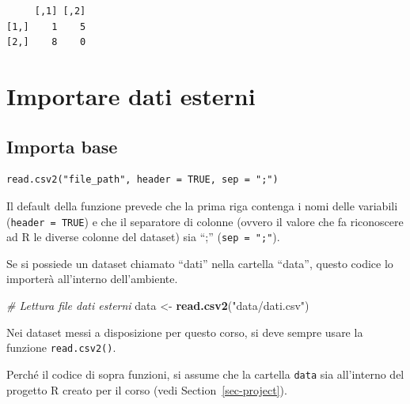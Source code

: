 \documentclass[
  a4paper,
  DIV=11,
  numbers=noendperiod]{scrreprt}
\newenvironment{Shaded}{\begin{snugshade}}{\end{snugshade}}
\newcommand{\CommentTok}[1]{\textcolor[rgb]{0.56,0.35,0.01}{\textit{#1}}}
\newcommand{\FunctionTok}[1]{\textcolor[rgb]{0.13,0.29,0.53}{\textbf{#1}}}
\newcommand{\NormalTok}[1]{#1}
\newcommand{\OtherTok}[1]{\textcolor[rgb]{0.56,0.35,0.01}{#1}}
\newcommand{\StringTok}[1]{\textcolor[rgb]{0.31,0.60,0.02}{#1}}
\begin{document}
\begin{verbatim}
     [,1] [,2]
[1,]    1    5
[2,]    8    0
\end{verbatim}

\section{Importare dati esterni}\label{importare-dati-esterni}

\subsection{Importa base}\label{importa-base}

\begin{verbatim}
read.csv2("file_path", header = TRUE, sep = ";")
\end{verbatim}

Il default della funzione prevede che la prima riga contenga i nomi
delle variabili (\texttt{header\ =\ TRUE}) e che il separatore di
colonne (ovvero il valore che fa riconoscere ad R le diverse colonne del
dataset) sia ``;'' (\texttt{sep\ =\ ";"}).

Se si possiede un dataset chiamato ``dati'' nella cartella ``data'',
questo codice lo importerà all'interno dell'ambiente.

\begin{Shaded}
\begin{Highlighting}[]
\CommentTok{\# Lettura file dati esterni}
\NormalTok{data }\OtherTok{\textless{}{-}} \FunctionTok{read.csv2}\NormalTok{(}\StringTok{"data/dati.csv"}\NormalTok{)}
\end{Highlighting}
\end{Shaded}

\begin{tcolorbox}[enhanced jigsaw, toprule=.15mm, left=2mm, leftrule=.75mm, breakable, coltitle=black, title={Caution}, bottomtitle=1mm, opacitybacktitle=0.6, toptitle=1mm, titlerule=0mm, bottomrule=.15mm, colframe=quarto-callout-caution-color-frame, arc=.35mm, rightrule=.15mm, opacityback=0, colbacktitle=quarto-callout-caution-color!10!white, colback=white]

Nei dataset messi a disposizione per questo corso, si deve sempre usare
la funzione \texttt{read.csv2()}.

Perché il codice di sopra funzioni, si assume che la cartella
\texttt{data} sia all'interno del progetto R creato per il corso (vedi
Section~\ref{sec-project}).

\end{tcolorbox}
\end{document}
